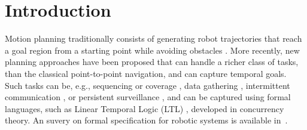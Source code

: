 \documentclass[Afour,sageh,times]{sagej}
\begin{document}
\maketitle
\section{Introduction}



{M}{otion} planning traditionally consists of generating robot trajectories that reach a  goal region from a starting point while avoiding obstacles \citep{lavalle2006planning}. More recently, {new planning approaches have been proposed that} can handle a richer class of tasks, than the classical point-to-point navigation, and can capture temporal goals. Such tasks can be, e.g., sequencing or coverage \citep{fainekos2005temporal}, data gathering \citep{guo2017distributed}, intermittent communication \citep{kantaros2018distributed}, or persistent surveillance \citep{leahy2016persistent}, and can be captured using formal languages, such as Linear Temporal Logic (LTL) \citep{baier2008principles},  developed in concurrency theory.  An suvery on formal specification for robotic systems  is available in~\cite{luckcuck2019formal}.
\end{document}
